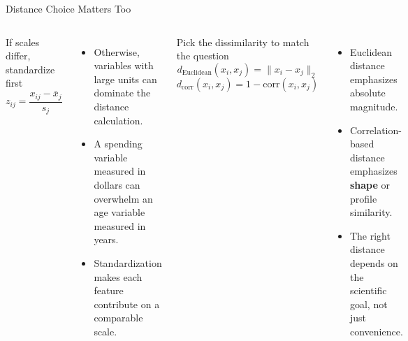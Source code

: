 \documentclass[aspectratio=169,11pt]{beamer}
\begin{document}
\begin{frame}[t]{Distance Choice Matters Too}
  \begin{columns}[T,totalwidth=\textwidth]
      \begin{block}{If scales differ, standardize first}
        \[
          z_{ij}
          =
          \frac{x_{ij}-\bar x_j}{s_j}
        \]
      \end{block}

      \begin{itemize}
        \item Otherwise, variables with large units can dominate the distance calculation.
        \item A spending variable measured in dollars can overwhelm an age variable measured in years.
        \item Standardization makes each feature contribute on a comparable scale.
      \end{itemize}
      \begin{block}{Pick the dissimilarity to match the question}
        \[
          d_{\text{Euclidean}}(x_i,x_j)
          =
          \|x_i-x_j\|_2
        \]
        \[
          d_{\text{corr}}(x_i,x_j)
          =
          1-\mathrm{corr}(x_i,x_j)
        \]
      \end{block}

      \begin{itemize}
        \item Euclidean distance emphasizes absolute magnitude.
        \item Correlation-based distance emphasizes \textbf{shape} or profile similarity.
        \item The right distance depends on the scientific goal, not just convenience.
      \end{itemize}
  \end{columns}
\end{frame}
\end{document}
